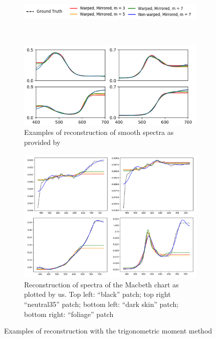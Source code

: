 \begin{figure}[t]
	\centering
	\begin{subfigure}[t]{0.70\textwidth}
		\includegraphics[width=\linewidth]{img/moments_reconstruction_legend.png}
	\end{subfigure} \\
	\vspace{1em}
	\begin{subfigure}[t]{0.45\textwidth}
		\includegraphics[width=\linewidth,height=0.2\textheight]{img/moments_reconstruction_Peters.png}
		\caption{Examples of reconstruction of smooth spectra as provided by~\citet{trigonometricMomentsPaper}}
		\label{fig:momentsReconstructionPeters}
	\end{subfigure} \hspace{0.1em}
	\begin{subfigure}[t]{0.45\textwidth}
		\includegraphics[width=\linewidth]{img/moments_reconstruction_ours.png}
		\caption{Reconstruction of spectra of the Macbeth chart as plotted by us. Top left: ``black'' patch; top right ``neutral35'' patch; bottom left: ``dark skin'' patch; bottom right: ``foliage'' patch}
		\label{fig:momentsReconstructionOur}
	\end{subfigure}
	\caption{Examples of reconstruction with the trigonometric moment method}
	\label{fig:momentsReconstructionComparison}
\end{figure}


